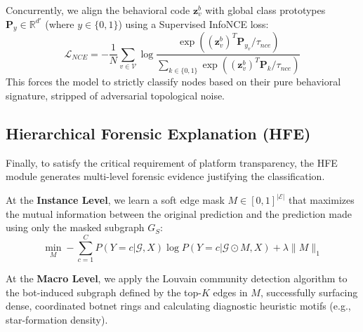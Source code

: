 Concurrently, we align the behavioral code $\mathbf{z}^b_v$ with global class prototypes $\mathbf{P}_y \in \mathbb{R}^{d'}$ (where $y \in \{0,1\}$) using a Supervised InfoNCE loss:
\begin{equation}
    \mathcal{L}_{NCE} = - \frac{1}{N} \sum_{v \in \mathcal{V}} \log \frac{\exp( (\mathbf{z}^b_v)^T \mathbf{P}_{y_v} / \tau_{nce} )}{\sum_{k \in \{0,1\}} \exp( (\mathbf{z}^b_v)^T \mathbf{P}_k / \tau_{nce} )}
\end{equation}
This forces the model to strictly classify nodes based on their pure behavioral signature, stripped of adversarial topological noise.

\subsection{Hierarchical Forensic Explanation (HFE)}
Finally, to satisfy the critical requirement of platform transparency, the HFE module generates multi-level forensic evidence justifying the classification. 

At the \textbf{Instance Level}, we learn a soft edge mask $M \in [0,1]^{|\mathcal{E}|}$ that maximizes the mutual information between the original prediction and the prediction made using only the masked subgraph $G_S$:
\begin{equation}
    \min_{M} - \sum_{c=1}^C P(Y=c|\mathcal{G}, X) \log P(Y=c|\mathcal{G} \odot M, X) + \lambda \|M\|_1
\end{equation}

At the \textbf{Macro Level}, we apply the Louvain community detection algorithm to the bot-induced subgraph defined by the top-$K$ edges in $M$, successfully surfacing dense, coordinated botnet rings and calculating diagnostic heuristic motifs (e.g., star-formation density).
